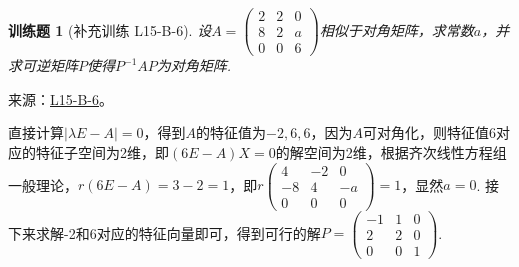 \documentclass[12pt,fontset=fandol]{ctexart}
\newtheorem{exercise}{训练题}[section]
\begin{document}
\begin{exercise}[补充训练 L15-B-6]\label{prob:L15-B-6}
设$A=\begin{pmatrix}
                2 & 2 & 0 \\ 8 & 2 & a \\ 0 & 0 & 6
            \end{pmatrix}$相似于对角矩阵，求常数$a$，并求可逆矩阵$P$使得$P^{-1}AP$为对角矩阵.
\end{exercise}
\noindent 来源：\href{https://github.com/yhwu-is/Linear-Algebra-Left-Undone/blob/new/%E8%AE%B2%E4%B9%89/%E4%B8%93%E9%A2%98/15%20%E7%9B%B8%E4%BC%BC%E6%A0%87%E5%87%86%E5%BD%A2%EF%BC%9A%E5%A4%8D%E6%95%B0%E5%9F%9F%E4%B8%8A%E7%9A%84%E5%B0%9D%E8%AF%95%E4%B8%8E%E7%90%86%E8%AE%BA.tex}{L15-B-6}。
\begin{solve}
直接计算$|\lambda E-A|=0$，得到$A$的特征值为$-2,6,6$，因为$A$可对角化，则特征值6对应的特征子空间为2维，即$(6E-A)X=0$的解空间为2维，根据齐次线性方程组一般理论，$r(6E-A)=3-2=1$，即$r\begin{pmatrix}
                4 & -2 & 0 \\ -8 & 4 & -a \\ 0 & 0 & 0
            \end{pmatrix}=1$，显然$a=0$. 接下来求解-2和6对应的特征向量即可，得到可行的解$P=\begin{pmatrix}
                -1 & 1 & 0 \\ 2 & 2 & 0 \\ 0 & 0 & 1
            \end{pmatrix}$.
\end{solve}
\end{document}

